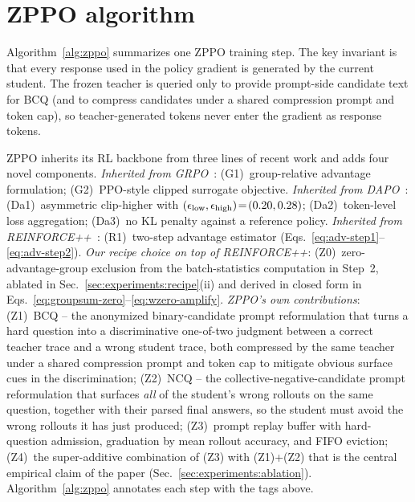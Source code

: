 \section{ZPPO algorithm}
\label{sec:appendix:algorithm}

Algorithm~\ref{alg:zppo} summarizes one ZPPO training step. The key invariant is that every response used in the policy gradient is generated by the current student. The frozen teacher is queried only to provide prompt-side candidate text for BCQ (and to compress candidates under a shared compression prompt and token cap), so teacher-generated tokens never enter the gradient as response tokens.

ZPPO inherits its RL backbone from three lines of recent work and adds four novel components. \emph{Inherited from GRPO~\citep{shao2024deepseekmath}}: (G1)~group-relative advantage formulation; (G2)~PPO-style clipped surrogate objective. \emph{Inherited from DAPO~\citep{yu2025dapo}}: (Da1)~asymmetric clip-higher with $(\epsilon_{\rm low},\epsilon_{\rm high})\!=\!(0.20, 0.28)$; (Da2)~token-level loss aggregation; (Da3)~no KL penalty against a reference policy. \emph{Inherited from REINFORCE++~\citep{hu2025reinforce++}}: (R1)~two-step advantage estimator (Eqs.~\ref{eq:adv-step1}--\ref{eq:adv-step2}). \emph{Our recipe choice on top of REINFORCE++}: (Z0)~zero-advantage-group exclusion from the batch-statistics computation in Step~2, ablated in Sec.~\ref{sec:experiments:recipe}(ii) and derived in closed form in Eqs.~\ref{eq:groupsum-zero}--\ref{eq:wzero-amplify}. \emph{ZPPO's own contributions}: (Z1)~BCQ -- the anonymized binary-candidate prompt reformulation that turns a hard question into a discriminative one-of-two judgment between a correct teacher trace and a wrong student trace, both compressed by the same teacher under a shared compression prompt and token cap to mitigate obvious surface cues in the discrimination; (Z2)~NCQ -- the collective-negative-candidate prompt reformulation that surfaces \emph{all} of the student's wrong rollouts on the same question, together with their parsed final answers, so the student must avoid the wrong rollouts it has just produced; (Z3)~prompt replay buffer with hard-question admission, graduation by mean rollout accuracy, and FIFO eviction; (Z4)~the super-additive combination of (Z3) with (Z1)+(Z2) that is the central empirical claim of the paper (Sec.~\ref{sec:experiments:ablation}). Algorithm~\ref{alg:zppo} annotates each step with the tags above.

